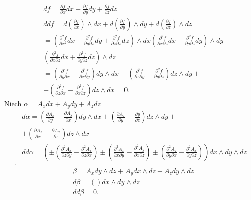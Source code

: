 \documentclass[../main.tex]{subfiles}
\begin{document}
\begin{align*}
&df = \frac{\partial f}{\partial x} dx+ \frac{\partial f}{\partial y} dy + \frac{\partial f}{\partial z} dz\\
&ddf = d\left( \frac{\partial f}{\partial x}  \right) \land dx + d\left( \frac{\partial f}{\partial y}  \right) \land dy + d\left( \frac{\partial f}{\partial z}  \right) \land dz = \\
&= \left( \frac{\partial^2 f}{\partial x^2} dx + \frac{\partial ^2 f}{\partial y \partial x} dy + \frac{\partial ^2 f}{\partial z \partial x} dz \right) \land dx \left( \frac{\partial ^2 f}{\partial x \partial z} dx + \frac{\partial ^2 f}{\partial y \partial z} dy \right) \land dy \\
&\left( \frac{\partial ^2 f}{\partial x \partial z} dx + \frac{\partial ^2 f}{\partial y \partial z} dz \right) \land dz \\
&= \left( \frac{\partial ^2 f}{\partial y\partial x} - \frac{\partial ^2f}{\partial x\partial y}  \right) dy\land dx + \left( \frac{\partial ^2f}{\partial z\partial y} - \frac{\partial ^2f}{\partial y\partial z}  \right) dz\land dy +\\
&+ \left( \frac{\partial ^2f}{\partial z\partial x} -\frac{\partial ^2f}{\partial x\partial z}  \right)dz\land dx = 0
.\end{align*}
Niech $\alpha = A_x dx + A_ydy + A_zdz$ \\
 \begin{align*}
     &d\alpha = \left( \frac{\partial A_x}{\partial y} - \frac{\partial A_y}{\partial x}  \right) dy\land dx + \left( \frac{\partial A_z}{\partial y} - \frac{\partial y}{\partial z}  \right) dz\land dy +\\
     &+ \left( \frac{\partial A_z}{\partial x} - \frac{\partial A_x}{\partial z}  \right)dz\land dx  \\
     &dd\alpha = \left( \pm \left( \frac{\partial ^2A_x}{\partial z\partial y} - \frac{\partial ^2A_x}{\partial z \partial x}  \right) \pm \left( \frac{\partial ^2A_z}{\partial x\partial y}  - \frac{\partial ^2A_y}{\partial x\partial z}\right) \pm \left( \frac{\partial ^2A_z}{\partial y\partial x}  - \frac{\partial ^2A_x}{\partial y\partial z} \right)  \right)dx\land dy\land dz  \\
.\end{align*}
\begin{align*}
    &\beta = A_xdy\land dz + A_ydx\land dz + A_zdy\land dz\\
    &d\beta = \left(  \right) dx\land dy\land dz\\
    &dd\beta = 0
.\end{align*}
\end{document}
